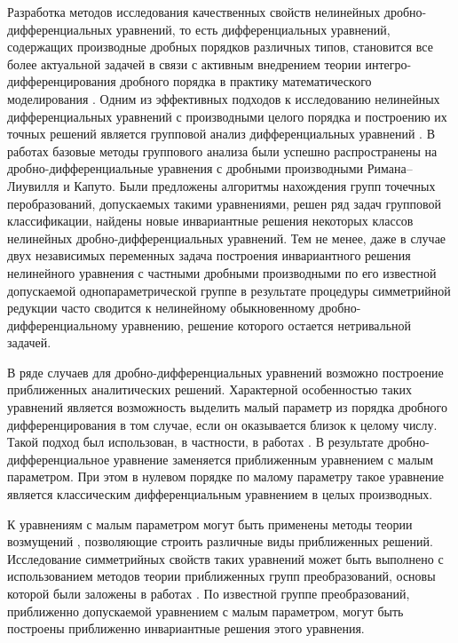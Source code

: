 Разработка методов исследования качественных свойств нелинейных дроб\-но-диф\-фе\-рен\-ци\-аль\-ных уравнений, то есть дифференциальных уравнений, содержащих производные дробных порядков различных типов, становится все более актуальной задачей в связи с активным внедрением теории интегро-дифференцирования дробного порядка \cite{LSU:SKM, LSU:KST} в практику математического моделирования \cite{LSU:Nah, LSU:Uch, LSU:Mai, LSU:GKMKD,LSU:Tar, LSU:BDST, LSU:US}. Одним из эффективных подходов к исследованию нелинейных дифференциальных уравнений с производными целого порядка и построению их точных решений является групповой анализ дифференциальных уравнений \cite{LSU:Ovs, LSU:Ibr}. В работах \cite{LSU:GKL_VU_07, LSU:GKL_PS_09, LSU:GKL_UMJ_12} базовые методы группового анализа были успешно распространены на дробно-дифференциальные уравнения с дробными производными Римана--Лиувилля и Капуто. Были предложены алгоритмы нахождения групп точечных перобразований, допускаемых такими уравнениями, решен ряд задач групповой классификации, найдены новые инвариантные решения некоторых классов нелинейных дробно-дифференциальных уравнений. Тем не менее, даже в случае двух независимых переменных задача построения инвариантного решения нелинейного уравнения с частными дробными производными по его известной допускаемой однопараметрической группе в результате процедуры симметрийной редукции часто сводится к нелинейному обыкновенному дроб\-но-диф\-фе\-рен\-ци\-аль\-но\-му уравнению, решение которого остается нетривальной задачей. 



В ряде случаев для дробно-дифференциальных уравнений возможно построение приближенных аналитических решений. Характерной особенностью таких уравнений является возможность выделить малый параметр из порядка дробного дифференцирования в том случае, если он оказывается близок к целому числу. Такой подход был использован, в частности, в работах \cite{LSU:TZ_PA_06, LSU:TG_PA_08, LSU:Tof_IJSM_13}. В результате дробно-дифференциальное уравнение заменяется приближенным уравнением с малым параметром. При этом в нулевом порядке по малому параметру такое уравнение является классическим дифференциальным уравнением в целых производных. 



К уравнениям с малым параметром могут быть применены методы теории возмущений \cite{LSU:Nay}, позволяющие строить различные виды приближенных решений. Исследование симметрийных свойств таких уравнений может быть выполнено с использованием методов теории приближенных групп преобразований, основы которой были заложены в работах \cite{LSU:BGI_MSb_88, LSU:BGI_INT_89, LSU:BGI_DU_93}. По известной группе преобразований, приближенно допускаемой уравнением с малым параметром, могут быть построены приближенно инвариантные решения этого уравнения. 



